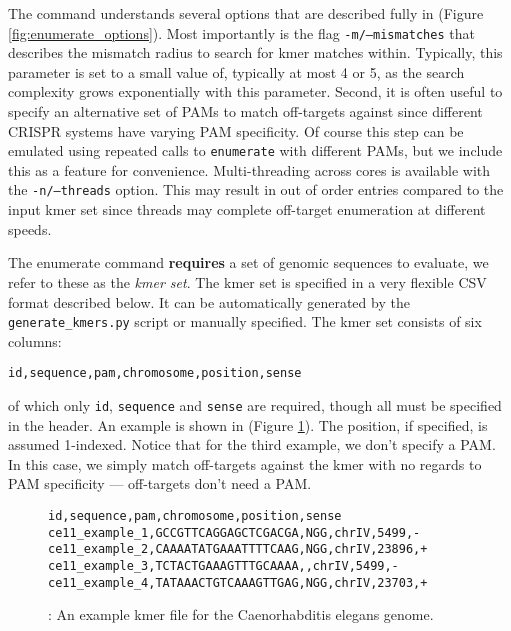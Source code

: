 \documentclass[10pt]{article}
\begin{document}
The command understands several options that are described fully in
(Figure \ref{fig:enumerate_options}). Most importantly is the flag
\texttt{-m/--mismatches} that describes the mismatch radius to search
for kmer matches within. Typically, this parameter is set to a small
value of, typically at most 4 or 5, as the search complexity grows
exponentially with this parameter. Second, it is often useful to
specify an alternative set of PAMs to match off-targets against since
different CRISPR systems have varying PAM specificity. Of course this
step can be emulated using repeated calls to \texttt{enumerate} with
different PAMs, but we include this as a feature for
convenience. Multi-threading across cores is available with the
\texttt{-n/--threads} option. This may result in out of order entries
compared to the input kmer set since threads may complete off-target
enumeration at different speeds.

The enumerate command {\bf requires} a set of genomic sequences to
evaluate, we refer to these as the {\it kmer set}. The kmer set is
specified in a very flexible CSV format described below. It can be
automatically generated by the \texttt{generate\_kmers.py} script
or manually specified. The kmer set consists of six columns:

\begin{center}
  \texttt{id,sequence,pam,chromosome,position,sense} 
\end{center}

of which only \texttt{id}, \texttt{sequence} and \texttt{sense} are
required, though all must be specified in the header. An example is
shown in (Figure \ref{fig:kmer_set}). The position, if specified, is
assumed 1-indexed. Notice that for the third example, we don't specify
a PAM. In this case, we simply match off-targets against the kmer with
no regards to PAM specificity --- off-targets don't need a PAM.

\begin{figure}[ht]
  \centering
  \begin{verbatim}
id,sequence,pam,chromosome,position,sense
ce11_example_1,GCCGTTCAGGAGCTCGACGA,NGG,chrIV,5499,-
ce11_example_2,CAAAATATGAAATTTTCAAG,NGG,chrIV,23896,+
ce11_example_3,TCTACTGAAAGTTTGCAAAA,,chrIV,5499,-
ce11_example_4,TATAAACTGTCAAAGTTGAG,NGG,chrIV,23703,+
  \end{verbatim}
  \caption{\label{fig:kmer_set}: An example kmer file for the
    Caenorhabditis elegans genome.}
\end{figure}
\end{document}
